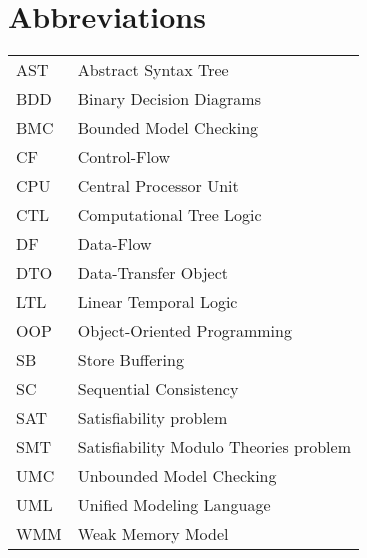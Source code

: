 \chapter*{Abbreviations}


\noindent
\begin{longtable}{@{}p{}p{}@{}}
AST & Abstract Syntax Tree \\
BDD & Binary Decision Diagrams \\
BMC & Bounded Model Checking \\
CF  & Control-Flow \\
CPU & Central Processor Unit \\
CTL & Computational Tree Logic \\
DF  & Data-Flow \\
DTO & Data-Transfer Object \\
LTL & Linear Temporal Logic \\
OOP & Object-Oriented Programming \\
SB  & Store Buffering \\
SC  & Sequential Consistency \\
SAT & Satisfiability problem \\
SMT & Satisfiability Modulo Theories problem \\
UMC & Unbounded Model Checking \\
UML & Unified Modeling Language \\ %
WMM & Weak Memory Model \\
\end{longtable}

